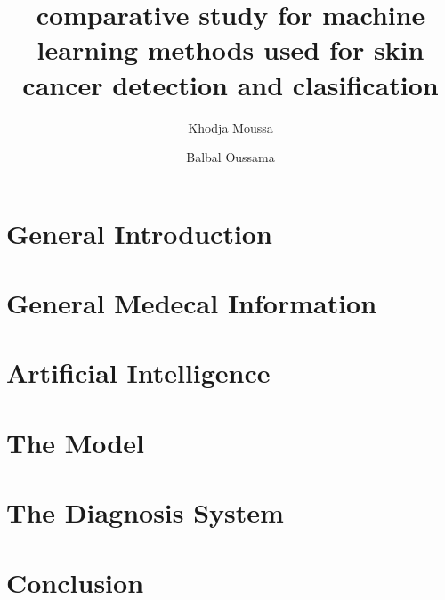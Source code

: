 \documentclass[12pt,a4paper]{report}
\title{comparative study for machine learning methods used for skin cancer detection and clasification}
\author{
	Khodja Moussa
	\and
	Balbal Oussama
}
\date{}
\begin{document}




\newpage




\tableofcontents
\listoffigures
\listoftables
\newpage

\chapter{General Introduction}


\chapter{General Medecal Information}





\chapter{Artificial Intelligence}



\chapter{The Model}


\chapter{The Diagnosis System}




\chapter{Conclusion}





\end{document}

